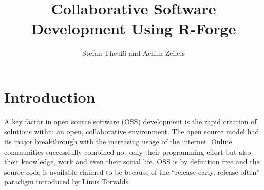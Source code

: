 \title{Collaborative Software Development Using R-Forge}
\author{Stefan Theu\ss{}l and Achim Zeileis}

\maketitle




\section*{Introduction}


A key factor in open source software (OSS) development is the rapid creation
of solutions within an open, collaborative environment. The open
source model had its major breakthrough with the increasing
usage of the internet. Online communities successfully combined
not only their programming effort but also their knowledge, work
and even their social life. OSS is by definition free and
the source code is available
claimed to be  because of the
``release early, release often'' paradigm introduced by Linus
Torvalds.


